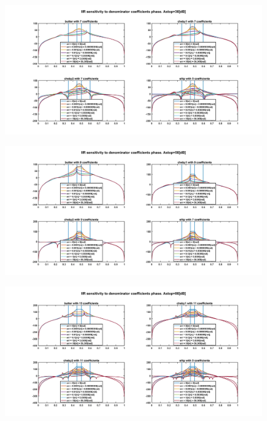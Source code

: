 \documentclass[12pt]{article}
\begin{document}
\begin{figure}[!ht]
\begin{center}
\includegraphics[width=1\textwidth]{Media/filterSensitivitySim/filtSensitivity30dB.jpg}
\end{center}
\end{figure}
\begin{figure}[!ht]
\begin{center}
\includegraphics[width=1\textwidth]{Media/filterSensitivitySim/filtSensitivity50dB.jpg}
\end{center}
\end{figure}
\begin{figure}[!ht]
\begin{center}
\includegraphics[width=1\textwidth]{Media/filterSensitivitySim/filtSensitivity80dB.jpg}
\end{center}
\end{figure}
\clearpage
\end{document}
